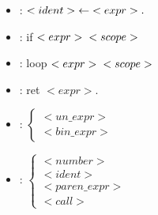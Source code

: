 \documentclass[12pt, a4paper]{article}
\begin{document}
\begin{itemize}
    \item{}
    :\hspace{\spacefromdefn}
    $<ident> \hspace{1mm}\leftarrow\hspace{1mm}<expr>.$

    \item{}
    :\hspace{\spacefromdefn}
    if \hspace{\spacebwops} $<expr> \hspace{\spacebwops}\hspace{\spacebwops}<scope>$

    \item{}
    :\hspace{\spacefromdefn}
    loop \hspace{\spacebwops} $<expr> \hspace{\spacebwops}\hspace{\spacebwops}<scope>$

    \item{}
    :\hspace{\spacefromdefn}
    ret \hspace{\spacebwops} $<expr>.$

    \item{}
    :\hspace{\spacefromdefn}
    \begin{math}
        \begin{cases}
            <un\_expr> \\
            <bin\_expr>
        \end{cases}
    \end{math}

    \item{}
    :\hspace{\spacefromdefn}
    \begin{math}
        \begin{cases}
            <number>      \\
            <ident>       \\
            <paren\_expr> \\
            <call>
        \end{cases}
    \end{math}


\end{itemize}
\end{document}
